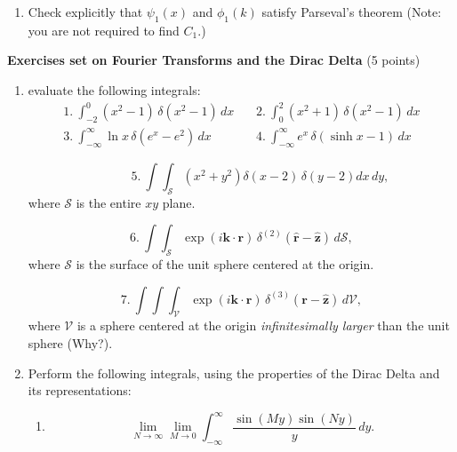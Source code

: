 \documentclass[fleqn]{article}
\begin{document}
\begin{enumerate}
\begin{enumerate}
        \item Check explicitly that $\psi _{1}\left( x\right)$ and $\phi _{1}\left(k\right)$ satisfy Parseval's theorem (Note: you are not required to find $C_1$.)
    
      \end{enumerate}
    
    
  \end{enumerate}

  \textbf{Exercises set on Fourier Transforms and the Dirac Delta} (5 points)
  \begin{enumerate}

    \item evaluate the following integrals: 
    \[
    \begin{array}{lll}
    1.\ \int_{-2}^{0}\left( x^{2}-1\right) \,\delta \left( x^{2}-1\right)
    \,dx & \, & 2.\ \int_{0}^{2}\left( x^{2}+1\right) \,\delta \left(
    x^{2}-1\right) \,dx \\ 
    3.\ \int_{-\infty }^{\infty }\ln x\,\delta \left( e^{x}-e^{2}\right)
    \,dx & \, & 4.\ \int_{-\infty }^{\infty }e^{x}\,\delta \left( \sinh
    x-1\right) \,dx
    \end{array}
    \]
    
    \[
    \hspace{3em} 5.\ \int \! \int_{\mathcal{S}}\left( x^{2}+y^{2}\right)
    \delta \left( x-2\right) \,\delta \left( y-2\right) dx\,dy,
    \]
    where $\mathcal{S}$ is the entire $xy$ plane. 
    
    \[
    6.\ \int \! \int_{\mathcal{S}}\exp \left( i\mathbf{k\cdot r}\right) \,\delta
    ^{\left( 2\right) }\left( \mathbf{\hat{r}}-\mathbf{\hat{z}}\right) \,d
    \mathcal{S},
    \]
    where $\mathcal{S}$ is the surface of the unit sphere centered at the
    origin. 
    
    \[
    7.\ \int \! \int \! \int_{\mathcal{V}}\exp \left( i\mathbf{k\cdot r}\right)
    \,\delta ^{\left( 3\right) }\left( \mathbf{r}-\mathbf{\hat{z}}\right) \,d\mathcal{V},
    \]
    where $\mathcal{V}$ is a sphere centered at the origin {\it infinitesimally larger} than the unit sphere (Why?).
    
    
  
    \item Perform the following integrals, using the properties of the  Dirac Delta and its representations:
    \begin{enumerate}
    \item
    \[
    \lim_{N\rightarrow \infty }\lim_{M\rightarrow 0}\int_{-\infty }^{\infty }
    \frac{\sin \left( My\right) \sin \left( Ny\right) }{y}\,dy.
    \]
    

\end{enumerate}
\end{enumerate}
\end{document}
